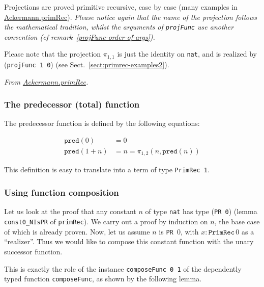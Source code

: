 Projections are proved primitive recursive, case by case (many examples in 
\href{../theories/html/hydras.Ackermann.primRec.html}{Ackermann.primRec}).
\emph{Please notice again that the name of the projection follows the mathematical tradition, 
whilst the arguments of  \texttt{projFunc} use another convention (\emph{cf} remark~\vref{projFunc-order-of-args}).}




Please note that the projection $\pi_{1,1}$ is just the identity on \texttt{nat}, and is realized by 
(\texttt{projFunc 1 0}) (see Sect.~\vref{sect:primrec-examples2}).


\vspace{4pt}
\noindent
\emph{From \href{../theories/html/hydras.Ackermann.primRec.html}{Ackermann.primRec}.}



\subsubsection{The predecessor (total) function}

The predecessor function is defined by the following equations:

\begin{align*}
\texttt{pred}(0) &= 0 \\
\texttt{pred}(1+n) &= n = \pi_{1,2}(n,\texttt{pred}(n))
\end{align*}

This definition is easy to translate into a term of type \texttt{PrimRec 1}.


\subsubsection{Using function composition}

Let us look at the proof that any constant $n$ of type \texttt{nat} has type (\texttt{PR 0})
(lemma  \texttt{const0\_NIsPR} of \texttt{primRec}). We carry out a proof by induction on $n$, the base case of which is already proven.
Now, let us assume $n$ is \texttt{PR $0$}, with $x:\texttt{PrimRec}\,0$ as a ``realizer''.
Thus we would like to compose this constant function with the unary successor function.

This is exactly the role of the instance \texttt{composeFunc 0 1} of the dependently typed
function \texttt{composeFunc}, as shown by the following lemma.

